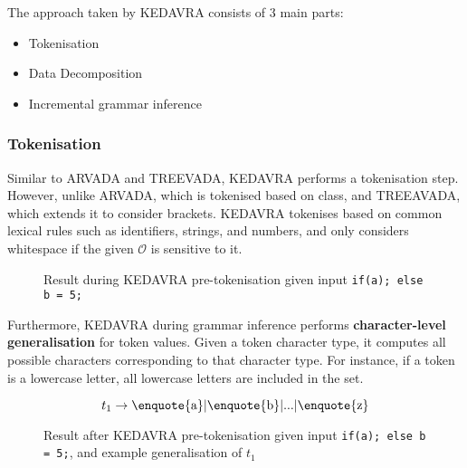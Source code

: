 \vspace{\baselineskip}
The approach taken by KEDAVRA consists of 3 main parts:
\begin{itemize}
    \item Tokenisation
    \item Data Decomposition
    \item Incremental grammar inference
\end{itemize}

\subsubsection{Tokenisation}
Similar to ARVADA and TREEVADA, KEDAVRA performs a tokenisation step. However, unlike ARVADA, which is tokenised based on class, and TREEAVADA, which extends it to consider brackets. KEDAVRA tokenises based on common lexical rules such as identifiers, strings, and numbers, and only considers whitespace if the given $\mathcal{O}$ is sensitive to it. 

\begin{figure}[h!]
\centering
{}
\caption{Result during KEDAVRA pre-tokenisation given input \texttt{if(a); else b = 5;}}
\label{fig:pre-tokenising KEDAVRA}
\end{figure}

Furthermore, KEDAVRA during grammar inference performs \textbf{character-level generalisation} for token values. Given a token character type,  it computes all possible characters corresponding to that character type. For instance, if a token is a lowercase letter, all lowercase letters are included in the set.

\begin{figure}[H]
\centering
{}

\[
t_1 \rightarrow \text{\enquote{a}}|\text{\enquote{b}}|...|\text{\enquote{z}}
\]

\caption{Result after KEDAVRA pre-tokenisation given input \texttt{if(a); else b = 5;}, and example generalisation of $t_1$}
\label{fig:pre-tokenised KEDAVRA}
\end{figure}

